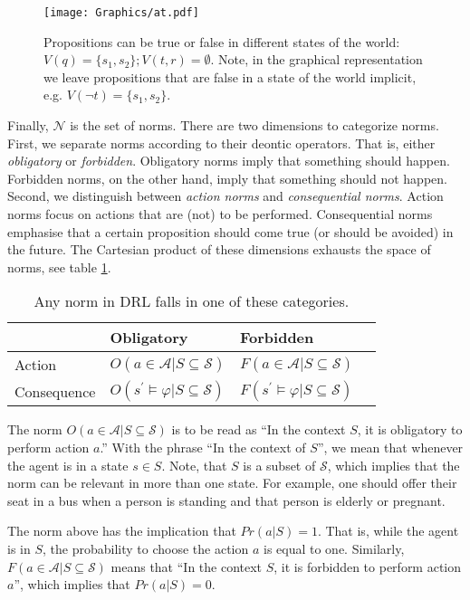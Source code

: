 \begin{figure}[h]
	\centering
	\texttt{[image: Graphics/at.pdf]}
	\caption{Propositions can be true or false in different states of the world: ${V(q) = \{s_1, s_2\} }; V(t,r) = \emptyset$. Note, in the graphical representation we leave propositions that are false in a state of the world implicit, e.g. ${V(\neg t) = \{ s_1, s_2 \} }$.}
	\label{AT}
\end{figure}

Finally, $\mathcal{N}$ is the set of norms. There are two dimensions to categorize norms. First, we separate norms according to their deontic operators. That is, either \emph{obligatory} or \emph{forbidden}. Obligatory norms imply that something should happen. Forbidden norms, on the other hand, imply that something should not happen. Second, we distinguish between \emph{action norms} and \emph{consequential norms}. Action norms focus on actions that are (not) to be performed. Consequential norms emphasise that a certain proposition should come true (or should be avoided) in the future. The Cartesian product of these dimensions exhausts the space of norms, see table \ref{normstable}. %

\begin{table}[h]
\centering
\begin{tabular}{llll}
            & Obligatory     & Forbidden     \\ \midrule
Action      & $O(a \in \mathcal{A}| S \subseteq \mathcal{S})$       & $F(a \in \mathcal{A}|S \subseteq \mathcal{S})$	     \\ \midrule
Consequence & $O(s^{\prime} \vDash \varphi|S \subseteq \mathcal{S})$ & $F(s^{\prime} \vDash \varphi|S \subseteq \mathcal{S})$ \\ 
\end{tabular}
\caption{Any norm in DRL falls in one of these categories.}
\label{normstable}
\end{table}

The norm $O(a \in \mathcal{A}| S \subseteq \mathcal{S})$ is to be read as ``In the context $S$, it is obligatory to perform action $a$.'' With the phrase ``In the context of $S$'', we mean that whenever the agent is in a state $s \in S$. Note, that $S$ is a subset of $\mathcal{S}$, which implies that the norm can be relevant in more than one state. For example, one should offer their seat in a bus when a person is standing and that person is elderly or pregnant. 

The norm above has the implication that $Pr(a | S) = 1$. That is, while the agent is in $S$, the probability to choose the action $a$ is equal to one. Similarly, $F(a \in \mathcal{A}|S \subseteq \mathcal{S})$ means that ``In the context $S$, it is forbidden to perform action $a$'', which implies that $Pr(a | S) = 0$.

